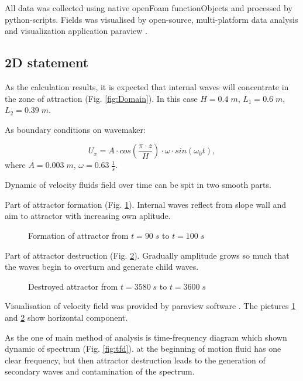 \documentclass{article}
\begin{document}
All data was collected using native openFoam functionObjects and processed by python-scripts. Fields was visualised by open-source, multi-platform data analysis and visualization application paraview \cite{paraview}.

\subsection{2D statement}

As the calculation results, it is expected that internal waves will concentrate in the zone of attraction (Fig. \ref{fig:Domain}). In this case $H = 0.4 \; m$, $L_1=0.6 \; m$, $L_2 = 0.39 \; m$.

As boundary conditions on wavemaker:

\begin{equation}
    U_x = A\cdot cos\left(\frac{\pi \cdot z}{H}\right)\cdot \omega \cdot  sin(\omega_0 t),
    \label{eq:wmc}
\end{equation}
where $A = 0.003 \; m$, $\omega = 0.63 \; \frac{1}{s}$.

Dynamic of velocity fluids field over time can be spit in two smooth parts.

Part of attractor formation (Fig. \ref{fig:attr2dForm}). Internal waves reflect from slope wall and aim to attractor with increasing own aplitude.

\begin{figure}
    \centering
    \caption{Formation of attractor from $t=90\;s$ to $t=100\;s$}
    \label{fig:attr2dForm}
\end{figure}

Part of attractor destruction (Fig. \ref{fig:attr2dDests}). Gradually amplitude grows so much that the waves begin to overturn and generate child waves.

\begin{figure}
    \centering
    \caption{Destroyed attractor from $t=3580\;s$ to $t=3600\;s$}
    \label{fig:attr2dDests}
\end{figure}

Visualisation of velocity field was provided by paraview software \cite{paraview}. The pictures \ref{fig:attr2dForm} and \ref{fig:attr2dDests} show horizontal component.

As the one of main method of analysis is time-frequency diagram which shown dynamic of spectrum (Fig. \ref{fig:tfd}). at the beginning of motion fluid has one clear frequency, but then attractor destruction leads to the generation of secondary waves and contamination of the spectrum. 
\end{document}
